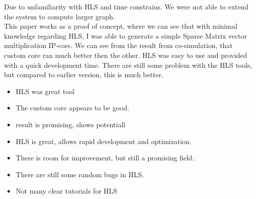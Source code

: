 Due to unfamiliarity with HLS and time constrains. We were not able to extend the system to compute larger graph. \\



This paper works as a proof of concept, where we can see that with minimal knowledge regarding HLS, I was able to generate a simple Sparse Matrix vector multiplication IP-core. We can see from the result from co-simulation, that custom core ran much better then the other. HLS was easy to use and provided with a quick development time. There are still some problem with the HLS tools, but compared to earlier version, this is much better.



\begin{itemize}
\item HLS was great tool
\item The custom core appears to be good. 
\item result is promising, shows potentiall
\item HLS is great, allows rapid development and optimization.
\item There is room for improvement, but still a promising field.
\item There are still some random bugs in HLS.
\item Not many clear tutorials for HLS
\end{itemize}
